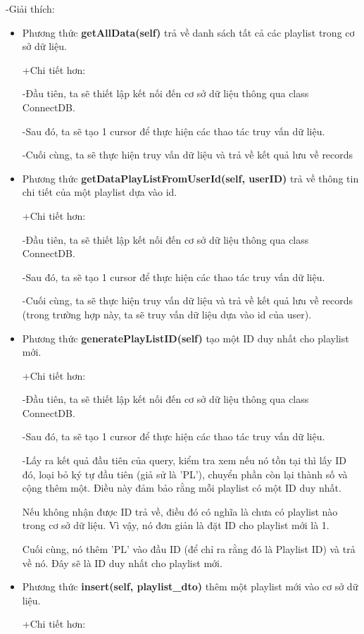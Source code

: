 \documentclass[a4paper]{article}
\begin{document}
\newpage
\begin{flushleft}
	-Giải thích:
	\begin{itemize}
		\item Phương thức \textbf{getAllData(self)} trả về danh sách tất cả các playlist trong cơ sở dữ liệu.
		      \begin{flushleft}
			      +Chi tiết hơn:

			      -Đầu tiên, ta sẽ thiết lập kết nối đến cơ sở dữ liệu thông qua class ConnectDB.

			      -Sau đó, ta sẽ tạo 1 cursor để thực hiện các thao tác truy vấn dữ liệu.

			      -Cuối cùng, ta sẽ thực hiện truy vấn dữ liệu và trả về kết quả lưu về records
		      \end{flushleft}
		\item Phương thức \textbf{getDataPlayListFromUserId(self, userID)} trả về thông tin chi tiết của một playlist dựa vào id.
		      \begin{flushleft}
			      +Chi tiết hơn:

			      -Đầu tiên, ta sẽ thiết lập kết nối đến cơ sở dữ liệu thông qua class ConnectDB.

			      -Sau đó, ta sẽ tạo 1 cursor để thực hiện các thao tác truy vấn dữ liệu.

			      -Cuối cùng, ta sẽ thực hiện truy vấn dữ liệu và trả về kết quả lưu về records (trong trường hợp này, ta sẽ truy vấn dữ liệu dựa vào id của user).
		      \end{flushleft}
		\item Phương thức \textbf{generatePlayListID(self)} tạo một ID duy nhất cho playlist mới.
		      \begin{flushleft}
			      +Chi tiết hơn:

			      -Đầu tiên, ta sẽ thiết lập kết nối đến cơ sở dữ liệu thông qua class ConnectDB.

			      -Sau đó, ta sẽ tạo 1 cursor để thực hiện các thao tác truy vấn dữ liệu.

			      -Lấy ra kết quả đầu tiên của query, kiểm tra xem nếu nó tồn tại thì
			      lấy ID đó, loại bỏ ký tự đầu tiên (giả sử là 'PL'), chuyển phần còn lại thành số và cộng thêm một.
			      Điều này đảm bảo rằng mỗi playlist có một ID duy nhất.

			      Nếu không nhận được ID trả về, điều đó có nghĩa là chưa có playlist nào trong cơ sở dữ liệu.
			      Vì vậy, nó đơn giản là đặt ID cho playlist mới là 1.

			      Cuối cùng, nó thêm 'PL' vào đầu ID (để chỉ ra rằng đó là Playlist ID) và trả về nó.
			      Đây sẽ là ID duy nhất cho playlist mới.
		      \end{flushleft}
		\item Phương thức \textbf{insert(self, playlist\_dto)} thêm một playlist mới vào cơ sở dữ liệu.
		      \begin{flushleft}
			      +Chi tiết hơn:


\end{flushleft}
\end{itemize}
\end{flushleft}
\end{document}

